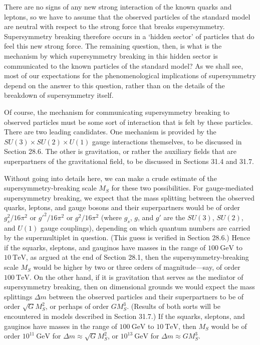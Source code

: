 There are no signs of any new strong interaction of the known quarks and
leptons, so we have to assume that the observed particles of the standard
model are neutral with respect to the strong force that breaks
supersymmetry. Supersymmetry breaking therefore occurs in a `hidden sector'
of particles that do feel this new strong force. The remaining question,
then, is what is the mechanism by which supersymmetry breaking in this
hidden sector is communicated to the known particles of the standard
model? As we shall see, most of our expectations for the phenomenological
implications of supersymmetry depend on the answer to this question, rather
than on the details of the breakdown of supersymmetry itself.

Of course, the mechanism for communicating supersymmetry breaking to
observed particles must be some sort of interaction that is felt by these
particles. There are two leading candidates. One mechanism is provided by
the \(SU(3)\times SU(2)\times U(1)\) gauge interactions themselves, to be
discussed in Section 28.6. The other is gravitation, or rather the auxiliary
fields that are superpartners of the gravitational field, to be discussed
in Sections 31.4 and 31.7.

Without going into details here, we can make a crude estimate of the
supersymmetry-breaking scale \(M_S\) for these two possibilities. For
gauge-mediated supersymmetry breaking, we expect that the mass splitting
between the observed quarks, leptons, and gauge bosons and their
superpartners would be of order \(g_s^2/16\pi^2\) or \(g'^2/16\pi^2\) or
\(g^2/16\pi^2\) (where \(g_s\), \(g\), and \(g'\) are the \(SU(3)\),
\(SU(2)\), and \(U(1)\) gauge couplings), depending on which quantum
numbers are carried by the supermultiplet in question. (This guess is
verified in Section 28.6.) Hence if the squarks, sleptons, and gauginos have
masses in the range of \(100\ \mathrm{GeV}\) to \(10\ \mathrm{TeV}\), as
argued at the end of Section 28.1, then the supersymmetry-breaking scale
\(M_S\) would be higher by two or three orders of magnitude---say, of order
\(100\ \mathrm{TeV}\). On the other hand, if it is gravitation that serves
as the mediator of supersymmetry breaking, then on dimensional grounds we
would expect the mass splittings \(\Delta m\) between the observed
particles and their superpartners to be of order \(\sqrt{G}M_S^2\), or
perhaps of order \(GM_S^3\). (Results of both sorts will be encountered in
models described in Section 31.7.) If the squarks, sleptons, and gauginos
have masses in the range of \(100\ \mathrm{GeV}\) to \(10\ \mathrm{TeV}\),
then \(M_S\) would be of order \(10^{11}\ \mathrm{GeV}\) for
\(\Delta m\approx\sqrt{G}M_S^2\), or \(10^{13}\ \mathrm{GeV}\) for
\(\Delta m\approx GM_S^3\).

